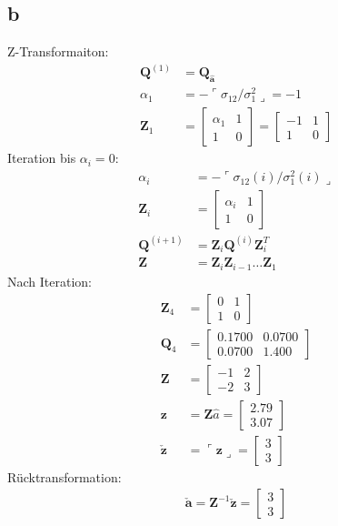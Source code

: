 \documentclass[12pt
,headinclude
,headsepline
,bibtotocnumbered
]{scrartcl}
\begin{document}
\subsection{b}
Z-Transformaiton:
\begin{align*}
	\boldsymbol{Q}^{(1)}&=\boldsymbol{Q_{\hat{a}}}\\
	\alpha_1&=-\ulcorner\sigma_{12}/\sigma^2_1\lrcorner=-1\\
	\boldsymbol{Z}_1&=\begin{bmatrix}
		\alpha_1&1\\1&0
	\end{bmatrix}=\begin{bmatrix}
	-1&1\\1&0
\end{bmatrix}
\end{align*}
Iteration bis $\alpha_i=0$:
\begin{align*}
	\alpha_i&=-\ulcorner\sigma_{12}\left( i\right) /\sigma^2_1\left( i\right)\lrcorner\\
	\boldsymbol{Z}_i&=\begin{bmatrix}
	\alpha_i&1\\1&0
	\end{bmatrix}\\
\boldsymbol{Q}^{(i+1)}&=\boldsymbol{Z}_i\boldsymbol{Q}^{(i)}\boldsymbol{Z}_i^{T}\\
	\boldsymbol{Z}&=\boldsymbol{Z}_{i}\boldsymbol{Z}_{i-1}\dots\boldsymbol{Z}_1
\end{align*}
Nach Iteration:
\begin{align*}
	\boldsymbol{Z}_4&=\begin{bmatrix}
		0&1\\1&0
	\end{bmatrix}\\
\boldsymbol{Q}_4&=\begin{bmatrix}
	0.1700&0.0700\\0.0700&1.400
\end{bmatrix}\\
\boldsymbol{Z}&=\begin{bmatrix}
	-1&2\\-2&3
\end{bmatrix}\\
\boldsymbol{z}&=\boldsymbol{Z}\hat{a}=\begin{bmatrix}
	2.79\\3.07
\end{bmatrix}\\
\check{\boldsymbol{z}}&=\ulcorner\boldsymbol{z}\lrcorner=\begin{bmatrix}
	3\\3
\end{bmatrix}
\end{align*}Rücktransformation:
\begin{align*}
\check{\boldsymbol{a}}=\boldsymbol{Z}^{-1}\boldsymbol{\check{z}}=\begin{bmatrix}
	3\\3
\end{bmatrix}
\end{align*}
\end{document}
